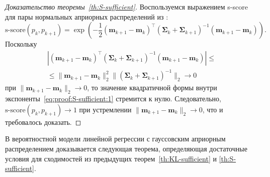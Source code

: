 \begin{proof}[Доказательство теоремы~\ref{th:S-sufficient}]
    Воспользуемся выражением s-score для пары нормальных априорных распределений из \cite{aduenko2017}:
    \begin{equation}
        \text{s-score}(p_k, p_{k+1}) = \exp{\left( -\frac{1}{2} (\mathbf{m}_{k+1} - \mathbf{m}_k)^\top \left( \mathbf{\Sigma}_k + \mathbf{\Sigma}_{k+1} \right)^{-1} (\mathbf{m}_{k+1} - \mathbf{m}_k) \right)}. \label{eq:proof:S-sufficient:1}
    \end{equation}
    Поскольку
    \begin{multline}
        \left| (\mathbf{m}_{k+1} - \mathbf{m}_k)^\top \left( \mathbf{\Sigma}_k + \mathbf{\Sigma}_{k+1} \right)^{-1} (\mathbf{m}_{k+1} - \mathbf{m}_k) \right| \leqslant \\
        \leqslant \| \mathbf{m}_{k+1} - \mathbf{m}_k \|_2^2 \| \left( \mathbf{\Sigma}_k + \mathbf{\Sigma}_{k+1} \right)^{-1} \|_2 \to 0
    \end{multline}
    при $\| \mathbf{m}_{k+1} - \mathbf{m}_k \|_2 \to 0$, то значение квадратичной формы внутри экспоненты~\eqref{eq:proof:S-sufficient:1} стремится к нулю. Следовательно, $\text{s-score}(p_k, p_{k+1}) \to 1$ при устремлении $\| \mathbf{m}_{k+1} - \mathbf{m}_k \|_2 \to 0$, что и требовалось доказать.
\end{proof}

В вероятностной модели линейной регрессии с гауссовским априорным распределением доказывается следующая теорема, определяющая достаточные условия для сходимостей из предыдущих теорем~\ref{th:KL-sufficient} и \ref{th:S-sufficient}.

